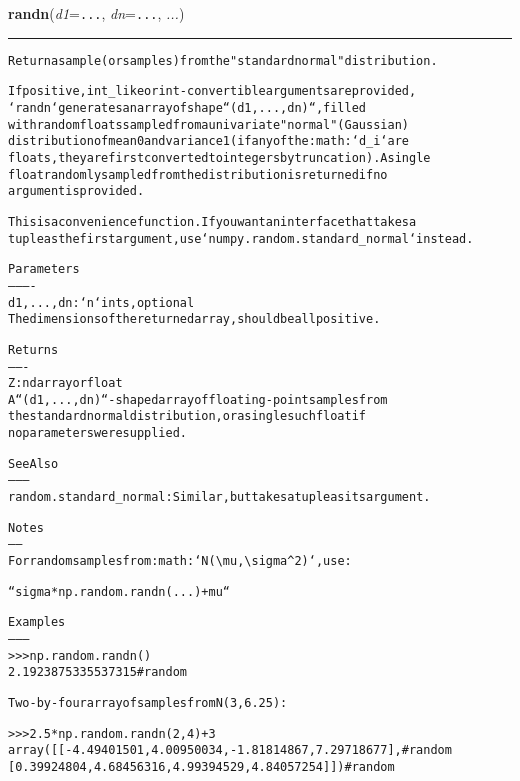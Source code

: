     \label{trunk:qstkutil:bollinger:randn}

    \vspace{0.5ex}

\hspace{.8\funcindent}\begin{boxedminipage}{\funcwidth}

    \raggedright \textbf{randn}(\textit{d1}={\tt ...}, \textit{dn}={\tt ...}, \textit{...})

    \vspace{-1.5ex}

    \rule{\textwidth}{0.5\fboxrule}
\setlength{\parskip}{2ex}
\begin{alltt}
Return a sample (or samples) from the "standard normal" distribution.

If positive, int\_like or int-convertible arguments are provided,
`randn` generates an array of shape ``(d1, ..., dn)``, filled
with random floats sampled from a univariate "normal" (Gaussian)
distribution of mean 0 and variance 1 (if any of the :math:`d\_i` are
floats, they are first converted to integers by truncation). A single
float randomly sampled from the distribution is returned if no
argument is provided.

This is a convenience function.  If you want an interface that takes a
tuple as the first argument, use `numpy.random.standard\_normal` instead.

Parameters
----------
d1, ..., dn : `n` ints, optional
    The dimensions of the returned array, should be all positive.

Returns
-------
Z : ndarray or float
    A ``(d1, ..., dn)``-shaped array of floating-point samples from
    the standard normal distribution, or a single such float if
    no parameters were supplied.

See Also
--------
random.standard\_normal : Similar, but takes a tuple as its argument.

Notes
-----
For random samples from :math:`N({\textbackslash}mu, {\textbackslash}sigma{\textasciicircum}2)`, use:

``sigma * np.random.randn(...) + mu``

Examples
--------
{\textgreater}{\textgreater}{\textgreater} np.random.randn()
2.1923875335537315 \#random

Two-by-four array of samples from N(3, 6.25):

{\textgreater}{\textgreater}{\textgreater} 2.5 * np.random.randn(2, 4) + 3
array([[-4.49401501,  4.00950034, -1.81814867,  7.29718677],  \#random
       [ 0.39924804,  4.68456316,  4.99394529,  4.84057254]]) \#random
\end{alltt}

\setlength{\parskip}{1ex}
    \end{boxedminipage}

